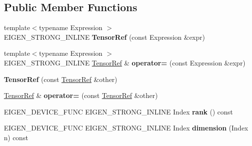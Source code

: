 \subsection*{Public Member Functions}
\begin{DoxyCompactItemize}
\item 
\mbox{\label{class_eigen_1_1_tensor_ref_ac14e6162b16cabfd5768e7656d90f805}} 
{\footnotesize template$<$typename Expression $>$ }\\E\+I\+G\+E\+N\+\_\+\+S\+T\+R\+O\+N\+G\+\_\+\+I\+N\+L\+I\+NE {\bfseries Tensor\+Ref} (const Expression \&expr)
\item 
\mbox{\label{class_eigen_1_1_tensor_ref_a3c9b742ec8e3174f749bbb3496ce3567}} 
{\footnotesize template$<$typename Expression $>$ }\\E\+I\+G\+E\+N\+\_\+\+S\+T\+R\+O\+N\+G\+\_\+\+I\+N\+L\+I\+NE \hyperlink{class_eigen_1_1_tensor_ref}{Tensor\+Ref} \& {\bfseries operator=} (const Expression \&expr)
\item 
\mbox{\label{class_eigen_1_1_tensor_ref_a16fc8bd7d36fe78299a14a27f5e5a9ce}} 
{\bfseries Tensor\+Ref} (const \hyperlink{class_eigen_1_1_tensor_ref}{Tensor\+Ref} \&other)
\item 
\mbox{\label{class_eigen_1_1_tensor_ref_a1e1e3403fa4245a05fff49cb58ba40fd}} 
\hyperlink{class_eigen_1_1_tensor_ref}{Tensor\+Ref} \& {\bfseries operator=} (const \hyperlink{class_eigen_1_1_tensor_ref}{Tensor\+Ref} \&other)
\item 
\mbox{\label{class_eigen_1_1_tensor_ref_a6ea330668a912404f71565c87896524c}} 
E\+I\+G\+E\+N\+\_\+\+D\+E\+V\+I\+C\+E\+\_\+\+F\+U\+NC E\+I\+G\+E\+N\+\_\+\+S\+T\+R\+O\+N\+G\+\_\+\+I\+N\+L\+I\+NE Index {\bfseries rank} () const
\item 
\mbox{\label{class_eigen_1_1_tensor_ref_a07a0c6c73c15a973bb84bfc56558da04}} 
E\+I\+G\+E\+N\+\_\+\+D\+E\+V\+I\+C\+E\+\_\+\+F\+U\+NC E\+I\+G\+E\+N\+\_\+\+S\+T\+R\+O\+N\+G\+\_\+\+I\+N\+L\+I\+NE Index {\bfseries dimension} (Index n) const
\item 
\mbox{\label{class_eigen_1_1_tensor_ref_a2c38ecc723df092fbc32a1fc1b3e7e64}} 

\end{DoxyCompactItemize}
